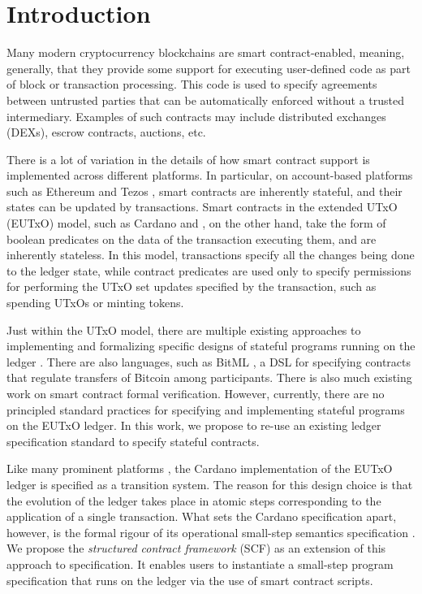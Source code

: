 \section{Introduction}
\label{sec:intro}

Many modern cryptocurrency blockchains are smart contract-enabled, meaning, generally, that
they provide some support for executing user-defined code as part of block or transaction processing.
This code is used to specify agreements between untrusted parties that can be
automatically enforced without a trusted intermediary. Examples of such
contracts may include distributed exchanges (DEXs), escrow contracts, auctions,
etc.

There is a lot of variation
in the details of how smart contract support is implemented across different platforms.
In particular, on account-based platforms such as Ethereum \cite{ethereum}
and Tezos \cite{tezos}, smart contracts are inherently stateful, and their states
can be updated by transactions. Smart contracts in
the extended UTxO (EUTxO) model, such as Cardano \cite{alonzo} and
\cite{ergo}, on the other hand, take the form of boolean predicates
on the data of the transaction executing them, and are inherently stateless.
In this model, transactions specify all the changes being done to the ledger
state, while contract predicates are used only to specify permissions
for performing the UTxO set updates specified by the transaction, such as spending
UTxOs or minting tokens.

Just within the UTxO model, there are multiple existing approaches to implementing and formalizing specific
designs of stateful programs running on the ledger \cite{eutxoma} \cite{marlowe} \cite{hydra}.
There are also languages, such as BitML \cite{bitml}, a DSL for specifying
contracts that regulate transfers of Bitcoin among participants.
There is also much existing work on smart contract formal verification.
However, currently, there are no principled standard practices for
specifying and implementing stateful programs on the EUTxO ledger.
In this work, we propose to re-use an existing ledger specification standard
to specify stateful contracts.

Like many prominent platforms
\cite{tezos} \cite{ethereum} \cite{Nakamoto} \cite{nervos} \cite{zil},
the Cardano implementation of the EUTxO ledger \cite{alonzo} is specified as a
transition system. The reason for this
design choice is that
the evolution of the ledger takes place in atomic steps corresponding to
the application of a single transaction. What sets the Cardano specification apart,
however, is the formal rigour of its operational
small-step semantics specification \cite{steps}.
We propose the \emph{structured contract framework}
(SCF) as an extension of this approach to specification.
It enables users
to instantiate a small-step program specification that runs on the ledger
via the use of smart contract scripts.


